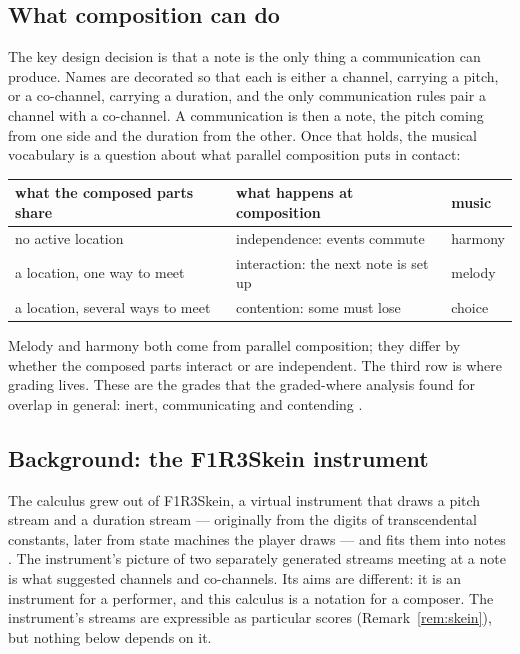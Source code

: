 \documentclass[11pt,a4paper]{article}
\theoremstyle{plain}
\theoremstyle{definition}
\theoremstyle{remark}
\begin{document}
\subsection{What composition can do}

The key design decision is that a note is the only thing a communication can
produce. Names are decorated so that each is either a channel, carrying a pitch,
or a co-channel, carrying a duration, and the only communication rules pair a
channel with a co-channel. A communication is then a note, the pitch coming from
one side and the duration from the other. Once that holds, the musical
vocabulary is a question about what parallel composition puts in contact:

\begin{center}
\begin{tabular}{@{}lll@{}}
\toprule
what the composed parts share & what happens at composition & music \\
\midrule
no active location                 & independence: events commute         & harmony \\
a location, one way to meet        & interaction: the next note is set up & melody \\
a location, several ways to meet   & contention: some must lose           & choice \\
\bottomrule
\end{tabular}
\end{center}

\noindent Melody and harmony both come from parallel composition; they differ
by whether the composed parts interact or are independent. The third row is
where grading lives. These are the grades that the graded-where analysis found
for overlap in general: inert, communicating and contending \cite{GWquantum}.

\subsection{Background: the F1R3Skein instrument}

The calculus grew out of F1R3Skein, a virtual instrument that draws a pitch
stream and a duration stream --- originally from the digits of transcendental
constants, later from state machines the player draws --- and fits them into
notes \cite{SkeinSpec,SkeinDrawn}. The instrument's picture of two separately
generated streams meeting at a note is what suggested channels and co-channels.
Its aims are different: it is an instrument for a performer, and this calculus
is a notation for a composer. The instrument's streams are expressible as
particular scores (Remark~\ref{rem:skein}), but nothing below depends on it.
\end{document}
